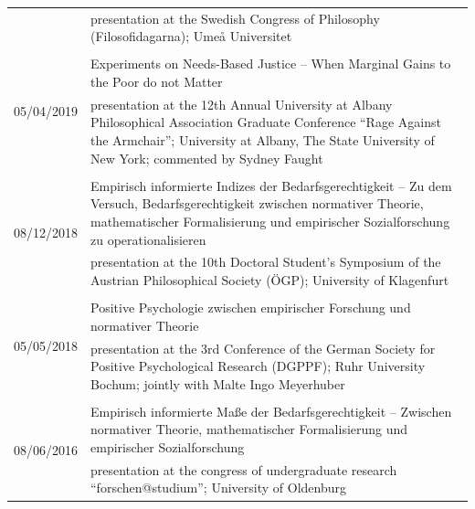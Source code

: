 \documentclass[a4paper,10pt]{article}
\begin{document}
\begin{longtable}{p{2.5cm}p{11cm}}
& \footnotesize{presentation at the Swedish Congress of Philosophy (Filosofidagarna); Umeå Universitet}\\
\\
\multirow{2}{2.5cm}{\footnotesize{05/04/2019}} & Experiments on Needs-Based Justice -- When Marginal Gains to the Poor do not Matter\\
& \footnotesize{presentation at the 12th Annual University at Albany Philosophical Association Graduate Conference \enquote{Rage Against the Armchair}; University at Albany, The State University of New York; commented by Sydney Faught}\\
\\
\multirow{2}{2.5cm}{\footnotesize{08/12/2018}} & Empirisch informierte Indizes der Bedarfsgerechtigkeit -- Zu dem Versuch, Bedarfsgerechtigkeit zwischen normativer Theorie, mathematischer Formalisierung und empirischer Sozialforschung zu operationalisieren\\
& \footnotesize{presentation at the 10th Doctoral Student's Symposium of the Austrian Philosophical Society (ÖGP); University of Klagenfurt}\\
\\
\multirow{2}{2.5cm}{\footnotesize{05/05/2018}} & Positive Psychologie zwischen empirischer Forschung und normativer Theorie\\
& \footnotesize{presentation at the 3rd Conference of the German Society for Positive Psychological Research (DGPPF); Ruhr University Bochum; jointly with Malte Ingo Meyerhuber}\\
\\
\multirow{2}{2.5cm}{\footnotesize{08/06/2016}} & Empirisch informierte Maße der Bedarfsgerechtigkeit -- Zwischen normativer Theorie, mathematischer Formalisierung und empirischer Sozialforschung\\
& \footnotesize{presentation at the congress of undergraduate research \enquote{forschen@studium}; University of Oldenburg}\\
\end{longtable}


\end{document}
